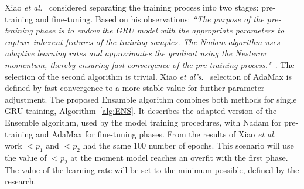 %
%
Xiao \textit{et al.}~\cite{xiao_accurate_2019} considered separating the training process into two stages: pre-training and fine-tuning.
Based on his observations: \textit{``The purpose of the pre-training phase is to endow the GRU model with the appropriate parameters to capture inherent features of the training samples.
The Nadam algorithm uses adaptive learning rates and approximates the gradient using the Nesterov momentum, thereby ensuring fast convergence of the pre-training process."}~\cite[p.~54195]{xiao_accurate_2019}.
The selection of the second algorithm is trivial.
Xiao \textit{et al's}.~\cite{xiao_accurate_2019} selection of AdaMax is defined by fast-convergence to a more stable value for further parameter adjustment.
The proposed Ensamble algorithm combines both methods for single GRU training, \mbox{Algorithm~\ref{alg:ENS}}.
It describes the adapted version of the Ensemble algorithm, used by the model training procedures, with Nadam for pre-training and AdaMax for fine-tuning phases.
From the results of Xiao \textit{et al.}~\cite{xiao_accurate_2019} work $<p_{1}$ and $<p_{2}$ had the same 100 number of epochs.
This scenario will use the value of $<p_{2}$ at the moment model reaches an overfit with the first phase.
The value of the learning rate will be set to the minimum possible, defined by the research.
